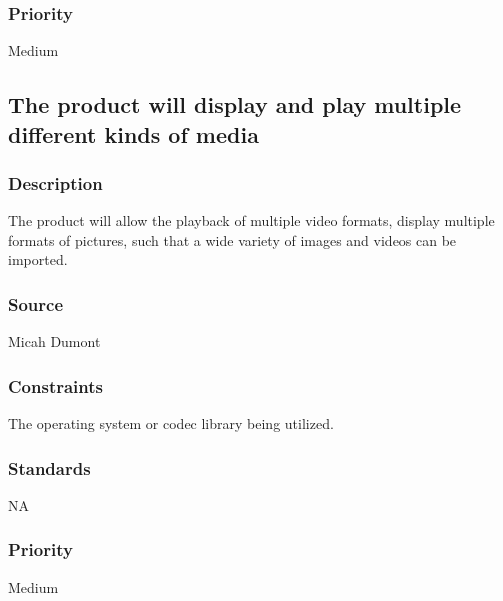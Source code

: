 \subsubsection{Priority}
Medium

\subsection{The product will display and play multiple different kinds of media}
\subsubsection{Description}
The product will allow the playback of multiple video formats, display multiple formats of pictures, such that a wide variety of images and videos can be imported.
\subsubsection{Source}
Micah Dumont
\subsubsection{Constraints}
The operating system or codec library being utilized.
\subsubsection{Standards}
NA
\subsubsection{Priority}
Medium
